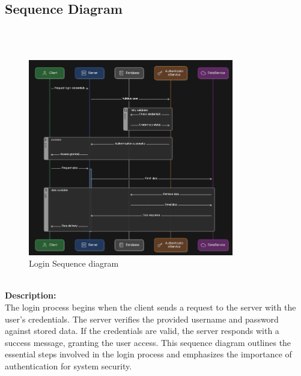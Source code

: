 \subsection{Sequence Diagram}
\\\\
\begin{figure}[h]
\centering
\includegraphics[width=0.8\textwidth, inner]{sections/BLL/LoginSequenceDiagram.png}
\caption{Login Sequence diagram}
\end{figure}\\
\textbf{Description:}\\ The login process begins when the client sends a request to the server with the user's credentials. The server verifies the provided username and password against stored data. If the credentials are valid, the server responds with a success message, granting the user access. This sequence diagram outlines the essential steps involved in the login process and emphasizes the importance of authentication for system security.\newpage

